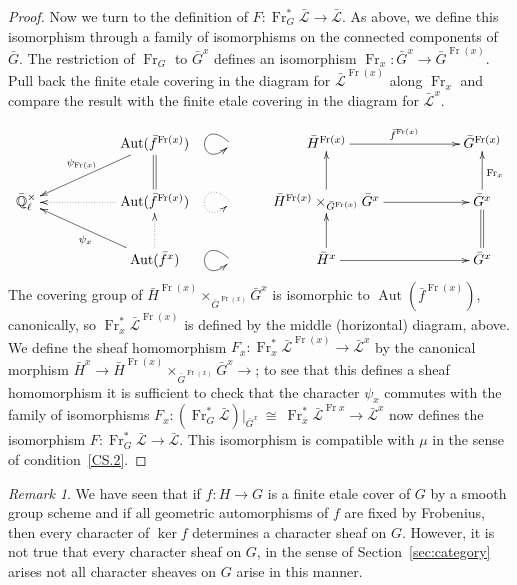 \documentclass[11pt]{amsart}
\theoremstyle{plain}
\theoremstyle{definition}
\theoremstyle{remark}
\newtheorem{remark}[theorem]{Remark}
\newcommand{\EE}{\mathbb{\bar Q}_\ell}
\newcommand{\Frob}{{\operatorname{Fr}}}
\DeclareMathOperator{\Aut}{Aut}
\newcommand{\iso}{{\ \cong\ }}
\newcommand{\gcs}[1]{{\mathcal{\bar #1}}}
\newcommand\Clifton[1]{\marginpar{\smaller\smaller CC: #1}}
\begin{document}
\begin{proof}
  Now we turn to the definition of $F : \Frob_{G}^* \gcs{L} \to \gcs{L}$.
  As above, we define this isomorphism through a family of
  isomorphisms on the connected components of ${\bar G}$. The
  restriction of $\Frob_{G}$ to ${\bar G}^x$ defines an isomorphism
  $\Frob_x : {\bar G}^x \to {\bar G}^{\Frob(x)}$.
  Pull back the finite etale covering in the diagram for
  $\gcs{L}^{\Frob(x)}$ along $\Frob_x$ and compare the result with the
  finite etale covering in the diagram for $\gcs{L}^{x}$.

  \[
  \xymatrix{
    && \ar[dll]_{\psi_{\Frob(x)}} \Aut({\bar f}^{\Frob(x)}) & \ar@(ul,dl)
    & {\bar H}^{\Frob(x)} \ar[rr]^{{\bar f}^{\Frob(x)}} && {\bar G}^{\Frob(x)}\\
    \EE^\times & & \ar@{.>}[ll] \Aut({\bar f}^{\Frob(x)})  \ar@{=}[u] & \ar@{.>}@(ul,dl)
    & \ar[u] {\bar H}^{\Frob(x)} \times_{{\bar G}^{\Frob(x)}} {\bar G}^x \ar[rr] && \ar[u]_{\Frob_{x}} {\bar G}^x\\
    & &  \ar[ull]^{\psi_x}  \ar@{.>}[u] \Aut({\bar f}^{x}) & \ar@(ul,dl)
    & \ar[u] {\bar H}^x \ar[rr] && \ar@{=} [u] {\bar G}^x\\
    }
  \]
  The covering group of ${\bar H}^{\Frob(x)} \times_{{\bar G}^{\Frob(x)}} {\bar G}^x$
  is isomorphic to $\Aut({\bar f}^{\Frob(x)})$, canonically, so
  $\Frob_x^* \gcs{L}^{\Frob(x)}$ is defined by the middle (horizontal)
  diagram, above.  We define the sheaf homomorphism
  $F_x : \Frob_x^* \gcs{L}^{\Frob(x)} \to \gcs{L}^x$ by the canonical morphism
  ${\bar H}^x \to {\bar H}^{\Frob(x)} \times_{{\bar G}^{\Frob(x)}} {\bar G}^x \to $;
  to see that this defines a sheaf homomorphism it is sufficient to
  check that the character $\psi_x$ commutes with the family of isomorphisms
  $F_x : (\Frob_{G}^* \gcs{L})\vert_{{\bar G}^x} \iso \Frob_x^* \gcs{L}^{\Frob{x}} \to \gcs{L}^x$
  now defines the isomorphism $F : \Frob_{G}^* \gcs{L} \to \gcs{L}$.
  \Clifton{Add some detail here.}
  This isomorphism is compatible with $\mu$ in the sense of condition~\ref{CS.2}.
\end{proof}

\begin{remark}
  We have seen that if $f : H\to G$ is a finite etale cover of $G$ by
  a smooth group scheme and if all geometric automorphisms of $f$ are
  fixed by Frobenius, then every character of $\ker f$ determines a
  character sheaf on $G$. However, it is not true that every character
  sheaf on $G$, in the sense of Section~\ref{sec:category} arises not
  all character sheaves on $G$ arise in this manner.
\end{remark}
%
\end{document}
